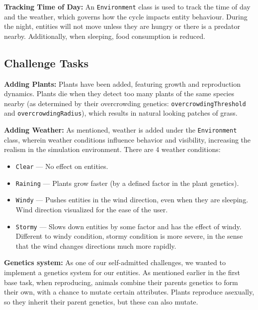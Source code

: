 \documentclass[10pt, a4paper]{scrartcl}
\begin{document}
\begin{multicols}{2}
    \noindent \textbf{Tracking Time of Day:} An \verb|Environment| class is used to track the time of day and the weather,
    which governs how the cycle impacts entity behaviour. During the night, entities will not move unless they are hungry
    or there is a predator nearby. Additionally, when sleeping, food consumption is reduced.

    \subsection{Challenge Tasks}

    \noindent \textbf{Adding Plants:} Plants have been added, featuring growth and reproduction dynamics.
    Plants die when they detect too many plants of the same species nearby (as determined by their overcrowding genetics:
    \verb|overcrowdingThreshold| and \verb|overcrowdingRadius|),
    which results in natural looking patches of grass.

    \noindent \textbf{Adding Weather:} As mentioned, weather is added under the \verb|Environment| class, wherein
    weather conditions influence behavior and visibility, increasing the realism in the simulation environment.
    There are 4 weather conditions:
    \begin{itemize}
      \item \verb|Clear| — No effect on entities.
      \item \verb|Raining| — Plants grow faster (by a defined factor in the plant genetics).
      \item \verb|Windy| — Pushes entities in the wind direction, even when they are sleeping.
      Wind direction visualized for the ease of the user.
      \item \verb|Stormy| — Slows down entities by some factor and has the effect of windy. Different to
      windy condition, stormy condition is more severe, in the sense that the wind changes directions much more rapidly.
    \end{itemize}

    \noindent \textbf{Genetics system:} As one of our self-admitted challenges, we wanted to implement a genetics system for our entities. As mentioned earlier in the first base task, when reproducing, animals combine their parents genetics to form their own, with a chance to mutate certain attributes. Plants reproduce asexually, so they inherit their parent genetics, but these can also mutate.


\end{multicols}
\end{document}
